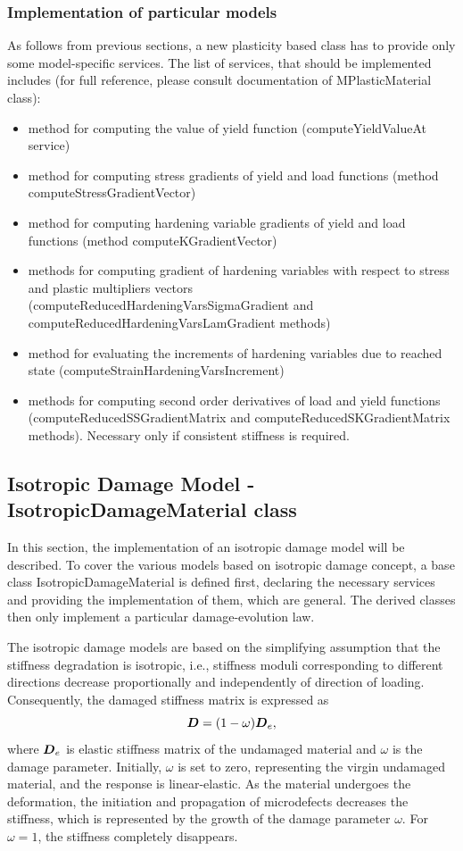 \documentclass[epsf,a4paper]{article}
\newcommand{\mbf}[1]{\mbox{\boldmath$#1$}}
\begin{document}
\subsubsection{Implementation of particular models}

As follows from previous sections, a new plasticity based class has to
provide only some model-specific services. The list of services, that
should be implemented includes (for full reference, please consult
documentation of MPlasticMaterial class):
\begin{itemize}
\item method for computing the value of yield function
  (computeYieldValueAt service)
\item method for computing stress gradients of yield and load
  functions (method computeStressGradientVector)
\item method for computing hardening variable gradients of yield and load
  functions (method computeKGradientVector)
\item methods for computing gradient of hardening variables with
  respect to stress and plastic multipliers vectors
  (computeReducedHardeningVarsSigmaGradient and
  computeReducedHardeningVarsLamGradient methods)
\item method for evaluating the increments of hardening variables due
  to reached state (computeStrainHardeningVarsIncrement)
\item methods for computing second order derivatives of load and yield
  functions (computeReducedSSGradientMatrix and
  computeReducedSKGradientMatrix methods). Necessary only if consistent stiffness is required.
\end{itemize}




\subsection{Isotropic Damage Model - IsotropicDamageMaterial class}
 In this section, the implementation of an isotropic damage model will be
 described. To cover the various models based on isotropic damage concept,
 a base class IsotropicDamageMaterial is defined first,
 declaring the necessary services and providing the implementation of
 them, which are general. The derived classes then only  implement a particular
 damage-evolution law.

 The isotropic damage models are based on the simplifying assumption
 that the stiffness degradation is isotropic, i.e., stiffness moduli
 corresponding to different directions decrease proportionally and
 independently of direction of loading. Consequently, the damaged
 stiffness matrix is expressed as
 $$
   \mbf{D} = (1-\omega)\mbf{D}_e,
 $$
 where $\mbf{D}_e$ is elastic stiffness matrix of the undamaged
 material and $\omega$ is the damage parameter. Initially, $\omega$ is
 set to zero, representing the virgin undamaged material, and the response is
 linear-elastic. As the material undergoes the deformation, the
 initiation and propagation of microdefects decreases the stiffness,
 which is represented by the growth of the damage parameter $\omega$.
 For $\omega = 1$, the stiffness completely disappears.
\end{document}
